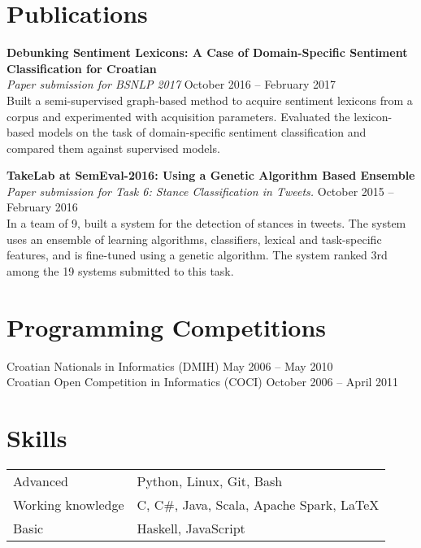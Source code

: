 \documentclass[margin,line]{resume}
\begin{document}
\begin{resume}
\vspace{1mm}
\section{\mysidestyle Publications}

\textbf{Debunking Sentiment Lexicons: A Case of Domain-Specific Sentiment Classification for Croatian} \vspace{1mm}\\\vspace{1mm}%
\textsl{Paper submission for BSNLP 2017} \hfill October 2016 -- February 2017\\%
Built a semi-supervised graph-based method to acquire sentiment lexicons from a corpus and experimented with acquisition parameters. Evaluated the lexicon-based models on the task of domain-specific sentiment classification and compared them against supervised models.

\textbf{TakeLab at SemEval-2016: Using a Genetic Algorithm Based Ensemble} \vspace{1mm}\\\vspace{1mm}%
\textsl{Paper submission for Task 6: Stance Classification in Tweets.} \hfill October 2015 -- February 2016\\%
In a team of 9, built a system for the detection of stances in tweets. The system uses an ensemble of learning algorithms, classifiers, lexical and task-specific features, and is fine-tuned using a genetic algorithm. The system ranked 3rd among the 19 systems submitted to this task.

\vspace{1mm}
\section{\mysidestyle Programming Competitions} 

Croatian Nationals in Informatics (DMIH) \hfill May 2006 -- May 2010\\%
Croatian Open Competition in Informatics (COCI) \hfill October 2006 -- April 2011%

\vspace{1mm}
\section{\mysidestyle Skills}

\begin{tabular}{@{}ll@{}}
Advanced & Python, Linux, Git, Bash \\%
Working knowledge & C, C\#, Java, Scala, Apache Spark, LaTeX \\%
Basic & Haskell, JavaScript \\%
\end{tabular}


\end{resume}
\end{document}
